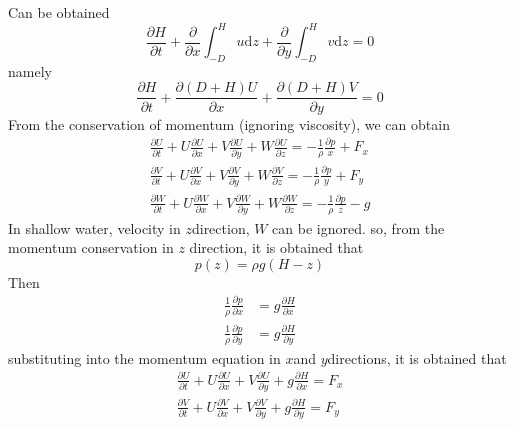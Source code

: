 \documentclass[10pt,a4paper]{article}
\newcommand{\td}{\mbox{d}}
\begin{document}
Can be obtained
\begin{equation}
	\frac{\partial H}{\partial t} + \frac{\partial}{\partial x}\int_{-D}^{H}u\td z + \frac{\partial}{\partial y}\int_{-D}^{H}v\td z = 0
\end{equation}
namely
\begin{equation}\label{mass}
	\frac{\partial H}{\partial t} + \frac{\partial (D+H)U}{\partial x} + \frac{\partial (D+H)V}{\partial y} = 0
\end{equation}
From the conservation of momentum (ignoring viscosity), we can obtain
\begin{equation}
	\begin{aligned}
		\frac{\partial U}{\partial t} + U\frac{\partial U}{\partial x} + V\frac{\partial U}{\partial y} + W\frac{\partial U}{\partial z} = - \frac{1}{\rho}\frac{\partial p}{x} + F_x\\
		\frac{\partial V}{\partial t} + U\frac{\partial V}{\partial x} + V\frac{\partial V}{\partial y} + W\frac{\partial V}{\partial z} = - \frac{1}{\rho}\frac{\partial p}{y} + F_y\\
		\frac{\partial W}{\partial t} + U\frac{\partial W}{\partial x} + V\frac{\partial W}{\partial y} + W\frac{\partial W}{\partial z} = - \frac{1}{\rho}\frac{\partial p}{z} - g
	\end{aligned}
\end{equation}
In shallow water, velocity in $z$direction, $W$ can be ignored. so, from the momentum conservation in $z$ direction, it is obtained that
\begin{equation*}
	p(z) = \rho g (H - z)
\end{equation*}
Then
\begin{equation*}
	\begin{aligned}
		\frac{1}{\rho}\frac{\partial p}{\partial x} &= g \frac{\partial H}{\partial x}\\
		\frac{1}{\rho}\frac{\partial p}{\partial y} &= g \frac{\partial H}{\partial y}
	\end{aligned}
\end{equation*}
substituting into the momentum equation in $x $and $y $directions, it is obtained that
\begin{equation}
	\begin{aligned}
		\frac{\partial U}{\partial t} + U\frac{\partial U}{\partial x} + V\frac{\partial U}{\partial y} + g\frac{\partial H}{\partial x} = F_x\\
		\frac{\partial V}{\partial t} + U\frac{\partial V}{\partial x} + V\frac{\partial V}{\partial y} + g\frac{\partial H}{\partial y} = F_y
	\end{aligned}
\end{equation}
\end{document}
